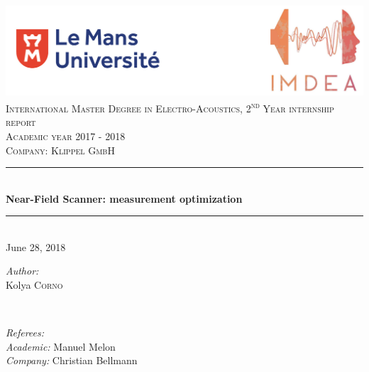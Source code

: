 \documentclass{report}
\newcommand{\ts}{\textsuperscript} 	%
\begin{document}

\begin{titlepage}

\newcommand{\HRule}{\rule{\linewidth}{0.5mm}} %

\center %

\includegraphics[scale=0.4]{logo.png} \\[3cm] %


\textsc{\large International Master Degree in Electro-Acoustics, 2\ts{nd} Year internship report}\\[0.4cm] %
\textsc{\normalsize Academic year 2017 - 2018}\\[0.7cm] %
\textsc{\normalsize Company: Klippel GmbH}\\[0.7cm] %


\HRule \\[0.4cm]
 { \huge \bfseries Near-Field Scanner: measurement optimization}\\[0.3cm] 
\HRule \\[1.5cm]

    
{\large June 28, 2018}\\[2cm] 


\begin{minipage}{0.4\textwidth}
\begin{flushleft} \large
\emph{Author:}\\ %
Kolya \textsc{Corno}

\end{flushleft}
\end{minipage}
~
\begin{minipage}{0.4\textwidth}
\begin{flushright} \large
\emph{Referees:} \\ %
\textit{Academic:} Manuel Melon \\
\textit{Company:} Christian Bellmann \\


\end{flushright}
\end{minipage}\\[2cm]
 
\vfill %

\end{titlepage}
\end{document}
